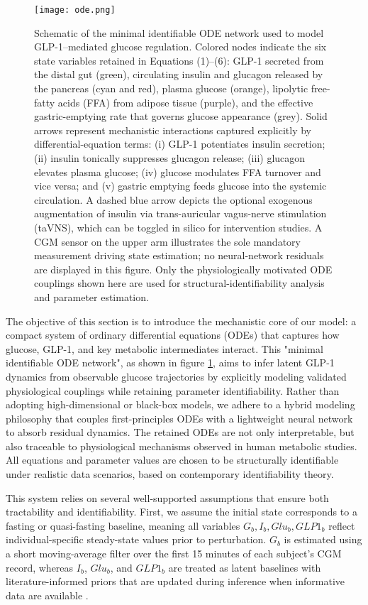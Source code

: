 \documentclass[9pt,shortpaper,twoside,web]{ieeecolor}
\begin{document}
\begin{figure}
    \centering
    \texttt{[image: ode.png]}
    \caption{Schematic of the minimal identifiable ODE network used to model GLP-1–mediated glucose regulation.
Colored nodes indicate the six state variables retained in Equations (1)–(6): GLP-1 secreted from the distal gut (green), circulating insulin and glucagon released by the pancreas (cyan and red), plasma glucose (orange), lipolytic free-fatty acids (FFA) from adipose tissue (purple), and the effective gastric-emptying rate that governs glucose appearance (grey). Solid arrows represent mechanistic interactions captured explicitly by differential-equation terms: (i) GLP-1 potentiates insulin secretion; (ii) insulin tonically suppresses glucagon release; (iii) glucagon elevates plasma glucose; (iv) glucose modulates FFA turnover and vice versa; and (v) gastric emptying feeds glucose into the systemic circulation. A dashed blue arrow depicts the optional exogenous augmentation of insulin via trans-auricular vagus-nerve stimulation (taVNS), which can be toggled in silico for intervention studies. A CGM sensor on the upper arm illustrates the sole mandatory measurement driving state estimation; no neural-network residuals are displayed in this figure. Only the physiologically motivated ODE couplings shown here are used for structural-identifiability analysis and parameter estimation.}
    \label{fig:ode}
\end{figure}

The objective of this section is to introduce the mechanistic core of our model: a compact system of ordinary differential equations (ODEs) that captures how glucose, GLP-1, and key metabolic intermediates interact. This "minimal identifiable ODE network", as shown in figure \ref{fig:ode}, aims to infer latent GLP-1 dynamics from observable glucose trajectories by explicitly modeling validated physiological couplings while retaining parameter identifiability. Rather than adopting high-dimensional or black-box models, we adhere to a hybrid modeling philosophy that couples first-principles ODEs with a lightweight neural network to absorb residual dynamics. The retained ODEs are not only interpretable, but also traceable to physiological mechanisms observed in human metabolic studies. All equations and parameter values are chosen to be structurally identifiable under realistic data scenarios, based on contemporary identifiability theory.

This system relies on several well-supported assumptions that ensure both tractability and identifiability. First, we assume the initial state corresponds to a fasting or quasi-fasting baseline, meaning all variables \( G_b, I_b, Glu_b, GLP1_b \) reflect individual-specific steady-state values prior to perturbation. \(G_b\) is estimated using a short moving-average filter over the first 15 minutes of each subject's CGM record, whereas \(I_b\), \(Glu_b\), and \(GLP1_b\) are treated as latent baselines with literature-informed priors that are updated during inference when informative data are available \cite{Visentin2016}.
\end{document}
